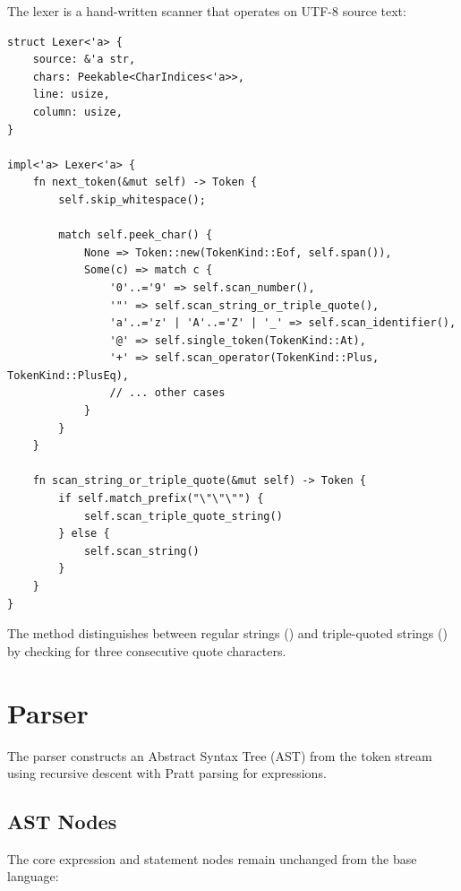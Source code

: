 The lexer is a hand-written scanner that operates on UTF-8 source text:

\begin{lstlisting}[language={}]
struct Lexer<'a> {
    source: &'a str,
    chars: Peekable<CharIndices<'a>>,
    line: usize,
    column: usize,
}

impl<'a> Lexer<'a> {
    fn next_token(&mut self) -> Token {
        self.skip_whitespace();

        match self.peek_char() {
            None => Token::new(TokenKind::Eof, self.span()),
            Some(c) => match c {
                '0'..='9' => self.scan_number(),
                '"' => self.scan_string_or_triple_quote(),
                'a'..='z' | 'A'..='Z' | '_' => self.scan_identifier(),
                '@' => self.single_token(TokenKind::At),
                '+' => self.scan_operator(TokenKind::Plus, TokenKind::PlusEq),
                // ... other cases
            }
        }
    }

    fn scan_string_or_triple_quote(&mut self) -> Token {
        if self.match_prefix("\"\"\"") {
            self.scan_triple_quote_string()
        } else {
            self.scan_string()
        }
    }
}
\end{lstlisting}

The  method distinguishes between regular strings () and triple-quoted strings () by checking for three consecutive quote characters.

\section{Parser}

The parser constructs an Abstract Syntax Tree (AST) from the token stream using recursive descent with Pratt parsing for expressions.

\subsection{AST Nodes}

The core expression and statement nodes remain unchanged from the base language:

